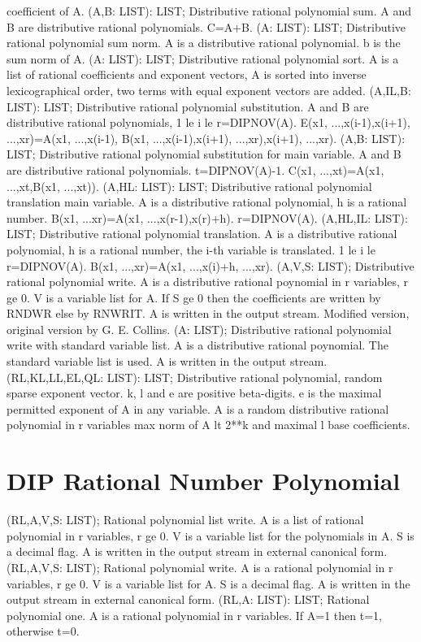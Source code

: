 coefficient of A. \ecom 
{} (A,B: LIST): LIST; \eproc
\bcom Distributive rational polynomial sum. A and B are
distributive rational polynomials. C=A+B.  \ecom 
{} (A: LIST): LIST; \eproc
\bcom Distributive rational polynomial sum norm. A is a distributive
rational polynomial. b is the sum norm of A. \ecom 
{} (A: LIST): LIST; \eproc
\bcom Distributive rational polynomial sort. A is a
list of rational coefficients and exponent vectors,
A is sorted into inverse lexicographical order,
two terms with equal exponent vectors are added.  \ecom 
{} (A,IL,B: LIST): LIST; \eproc
\bcom Distributive rational polynomial substitution. A and B are
distributive rational polynomials, 1 le i le r=DIPNOV(A).
E(x1, ...,x(i-1),x(i+1), ...,xr)=A(x1, ...,x(i-1),
B(x1, ...,x(i-1),x(i+1), ...,xr),x(i+1), ...,xr).  \ecom 
{} (A,B: LIST): LIST; \eproc
\bcom Distributive rational polynomial substitution for main variable.
A and B are distributive rational polynomials. t=DIPNOV(A)-1.
C(x1, ...,xt)=A(x1, ...,xt,B(x1, ...,xt)).  \ecom 
{} (A,HL: LIST): LIST; \eproc
\bcom Distributive rational polynomial translation main variable.
A is a distributive rational polynomial, h is a rational number.
B(x1, ...xr)=A(x1, ...,x(r-1),x(r)+h). r=DIPNOV(A).  \ecom 
{} (A,HL,IL: LIST): LIST; \eproc
\bcom Distributive rational polynomial translation. A is a
distributive rational polynomial, h is a rational number,
the i-th variable is translated. 1 le i le r=DIPNOV(A).
B(x1, ...,xr)=A(x1, ...,x(i)+h, ...,xr). \ecom 
{} (A,V,S: LIST); \eproc
\bcom Distributive rational polynomial write. A is a distributive
rational poynomial in r variables, r ge 0. V is a variable list
for A. If S ge 0 then the coefficients are written by RNDWR
else by RNWRIT. A is written in the output stream.
Modified version, original version by G. E. Collins.  \ecom 
{} (A: LIST); \eproc
\bcom Distributive rational polynomial write with standard variable
list. A is a distributive rational poynomial. The standard
variable list is used. A is written in the output stream. \ecom 
{} (RL,KL,LL,EL,QL: LIST): LIST; \eproc
\bcom Distributive rational polynomial, random sparse exponent vector.
k, l and e are positive beta-digits. e is the
maximal permitted exponent of A in any variable. A is a
random distributive rational polynomial in r variables
max norm of A lt 2**k and maximal l base coefficients.  \ecom 
\section{ DIP Rational Number Polynomial  } 
 (RL,A,V,S: LIST); \eproc
\bcom Rational polynomial list write. A is a list of rational
polynomial in r variables, r ge 0.  V is a variable list for
the polynomials in A. S is a decimal flag. A is written in the
output stream in external canonical form. \ecom 
{} (RL,A,V,S: LIST); \eproc
\bcom Rational polynomial write. A is a rational polynomial in r
variables, r ge 0.  V is a variable list for A. S is a decimal
flag. A is written in the output stream in external canonical form. \ecom 
{} (RL,A: LIST): LIST; \eproc
\bcom Rational polynomial one. A is a rational polynomial in r
variables. If A=1 then t=1, otherwise t=0.  \ecom 
